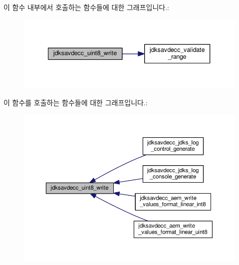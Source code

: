 이 함수 내부에서 호출하는 함수들에 대한 그래프입니다.\+:
\nopagebreak
\begin{figure}[H]
\begin{center}
\leavevmode
\includegraphics[width=340pt]{group__endian_ga76773f9a39ae810aec586d2bb3b617e5_cgraph}
\end{center}
\end{figure}




이 함수를 호출하는 함수들에 대한 그래프입니다.\+:
\nopagebreak
\begin{figure}[H]
\begin{center}
\leavevmode
\includegraphics[width=350pt]{group__endian_ga76773f9a39ae810aec586d2bb3b617e5_icgraph}
\end{center}
\end{figure}


